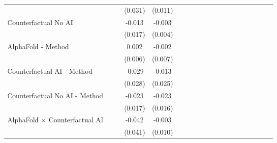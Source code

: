 \begin{tabular}{lcccccccccccccccccc}
                                                              &       &       & (0.031) & (0.011)     &       &       &       &       &     &      &      &      &      &      &      &      &      &   \\   
   Counterfactual No AI                                       &       &       & -0.013  & -0.003      &       &       &       &       &     &      &      &      &      &      &      &      &      &   \\   
                                                              &       &       & (0.017) & (0.004)     &       &       &       &       &     &      &      &      &      &      &      &      &      &   \\   
   AlphaFold - Method                                         &       &       & 0.002   & -0.002      &       &       &       &       &     &      &      &      &      &      &      &      &      &   \\   
                                                              &       &       & (0.006) & (0.007)     &       &       &       &       &     &      &      &      &      &      &      &      &      &   \\   
   Counterfactual AI - Method                                 &       &       & -0.029  & -0.013      &       &       &       &       &     &      &      &      &      &      &      &      &      &   \\   
                                                              &       &       & (0.028) & (0.025)     &       &       &       &       &     &      &      &      &      &      &      &      &      &   \\   
   Counterfactual No AI - Method                              &       &       & -0.023  & -0.023      &       &       &       &       &     &      &      &      &      &      &      &      &      &   \\   
                                                              &       &       & (0.017) & (0.016)     &       &       &       &       &     &      &      &      &      &      &      &      &      &   \\   
   AlphaFold $\times$ Counterfactual AI                       &       &       & -0.042  & -0.003      &       &       &       &       &     &      &      &      &      &      &      &      &      &   \\   
                                                              &       &       & (0.041) & (0.010)     &       &       &       &       &     &      &      &      &      &      &      &      &      &   \\   

\end{tabular}
